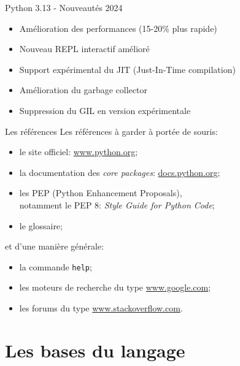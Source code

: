 \documentclass[dvipsnames]{beamer}
\providecommand{\tightlist}{%
  \setlength{\itemsep}{0pt}\setlength{\parskip}{0pt}}
\begin{document}
\begin{frame}{Python 3.13 - Nouveautés 2024}

    \begin{itemize}
        \item Amélioration des performances (15-20\% plus rapide)
        \item Nouveau REPL interactif amélioré
        \item Support expérimental du JIT (Just-In-Time compilation)
        \item Amélioration du garbage collector
        \item Suppression du GIL en version expérimentale
    \end{itemize}
\end{frame}

\begin{frame}
    [fragile]{Les références}
    Les références à garder à portée de souris:
    \begin{itemize}
        \tightlist
        \item le site officiel: \url{www.python.org};
        \item la documentation des \textit{core packages}:
              \url{docs.python.org};
        \item les PEP (Python Enhancement Proposals),\\ notamment le
                  PEP 8: \textit{Style Guide for Python Code};
        \item le glossaire;
    \end{itemize}

    et d'une manière générale:
    \begin{itemize}
        \tightlist
        \item la commande \texttt{help};
        \item les moteurs de recherche du type \url{www.google.com};
        \item les forums du type \url{www.stackoverflow.com}.
    \end{itemize}

\end{frame}

\section{Les bases du langage}
\end{document}
